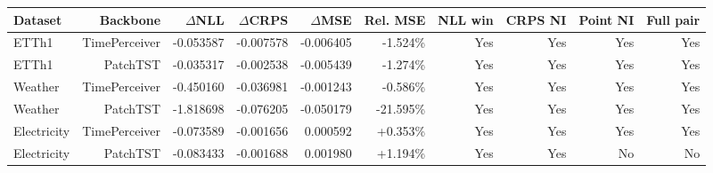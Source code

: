 \begin{tabular}{@{}lrrrrrrrrr@{}}
\toprule
Dataset & Backbone & $\Delta$NLL & $\Delta$CRPS & $\Delta$MSE & Rel. MSE & NLL win & CRPS NI & Point NI & Full pair \\
\midrule
ETTh1 & TimePerceiver & -0.053587 & -0.007578 & -0.006405 & -1.524\% & Yes & Yes & Yes & Yes \\
ETTh1 & PatchTST & -0.035317 & -0.002538 & -0.005439 & -1.274\% & Yes & Yes & Yes & Yes \\
Weather & TimePerceiver & -0.450160 & -0.036981 & -0.001243 & -0.586\% & Yes & Yes & Yes & Yes \\
Weather & PatchTST & -1.818698 & -0.076205 & -0.050179 & -21.595\% & Yes & Yes & Yes & Yes \\
Electricity & TimePerceiver & -0.073589 & -0.001656 & 0.000592 & +0.353\% & Yes & Yes & Yes & Yes \\
Electricity & PatchTST & -0.083433 & -0.001688 & 0.001980 & +1.194\% & Yes & Yes & No & No \\
\bottomrule
\end{tabular}
